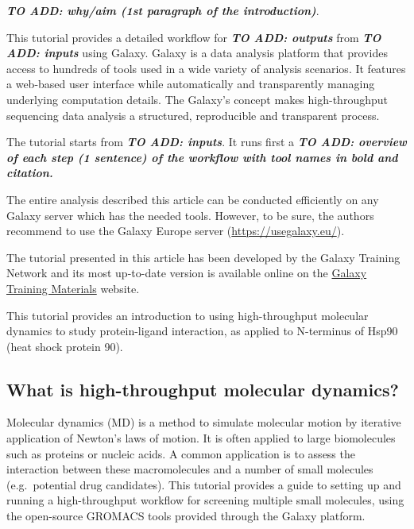 \documentclass[twocolumn]{bmcart}%
\begin{document}
\textbf{\emph{TO ADD: why/aim (1st paragraph of the introduction)}}.

This tutorial provides a detailed workflow for \textbf{\emph{TO ADD:
outputs}} from \textbf{\emph{TO ADD: inputs}} using Galaxy. Galaxy
\cite{afgan_galaxy_2018} is a data analysis platform that provides access
to hundreds of tools used in a wide variety of analysis scenarios. It
features a web-based user interface while automatically and
transparently managing underlying computation details. The Galaxy's
concept makes high-throughput sequencing data analysis a structured,
reproducible and transparent process.

The tutorial starts from \textbf{\emph{TO ADD: inputs}}. It runs first a
\textbf{\emph{TO ADD: overview of each step (1 sentence) of the workflow
with tool names in bold and citation.}}

The entire analysis described this article can be conducted efficiently
on any Galaxy server which has the needed tools. However, to be sure,
the authors recommend to use the Galaxy Europe server
(\url{https://usegalaxy.eu/}).

The tutorial presented in this article has been developed by the Galaxy
Training Network \cite{Batut2018} and its most up-to-date
version is available online on the
\href{https://training.galaxyproject.org/topics/computational-chemistry/tutorials/htmd-analysis/tutorial.html}{Galaxy
Training Materials} website.

This tutorial provides an introduction to using high-throughput
molecular dynamics to study protein-ligand interaction, as applied to
N-terminus of Hsp90 (heat shock protein 90).

\hypertarget{what-is-high-throughput-molecular-dynamics}{%
\subsection*{What is high-throughput molecular
dynamics?}\label{what-is-high-throughput-molecular-dynamics}}

Molecular dynamics (MD) is a method to simulate molecular motion by
iterative application of Newton's laws of motion. It is often applied to
large biomolecules such as proteins or nucleic acids. A common
application is to assess the interaction between these macromolecules
and a number of small molecules (e.g.~potential drug candidates). This
tutorial provides a guide to setting up and running a high-throughput
workflow for screening multiple small molecules, using the open-source
GROMACS tools provided through the Galaxy platform.
\end{document}
